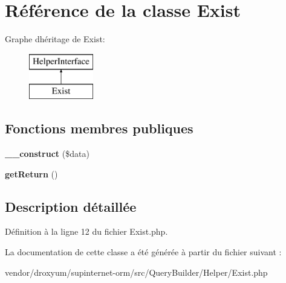 \hypertarget{class_o_r_m_1_1_query_builder_1_1_helper_1_1_exist}{}\section{Référence de la classe Exist}
\label{class_o_r_m_1_1_query_builder_1_1_helper_1_1_exist}
Graphe d\textquotesingle{}héritage de Exist\+:\begin{figure}[H]
\begin{center}
\leavevmode
\includegraphics[height=2.000000cm]{class_o_r_m_1_1_query_builder_1_1_helper_1_1_exist}
\end{center}
\end{figure}
\subsection*{Fonctions membres publiques}
\begin{DoxyCompactItemize}
\item 
{\bfseries \+\_\+\+\_\+construct} (\$data)\hypertarget{class_o_r_m_1_1_query_builder_1_1_helper_1_1_exist_ab452db2d5d284bffa31c9accbaeec836}{}\label{class_o_r_m_1_1_query_builder_1_1_helper_1_1_exist_ab452db2d5d284bffa31c9accbaeec836}

\item 
{\bfseries get\+Return} ()\hypertarget{class_o_r_m_1_1_query_builder_1_1_helper_1_1_exist_a76a9e4fbc3017b3eb344ecb084f2c3a9}{}\label{class_o_r_m_1_1_query_builder_1_1_helper_1_1_exist_a76a9e4fbc3017b3eb344ecb084f2c3a9}

\end{DoxyCompactItemize}


\subsection{Description détaillée}


Définition à la ligne 12 du fichier Exist.\+php.



La documentation de cette classe a été générée à partir du fichier suivant \+:\begin{DoxyCompactItemize}
\item 
vendor/droxyum/supinternet-\/orm/src/\+Query\+Builder/\+Helper/Exist.\+php\end{DoxyCompactItemize}
